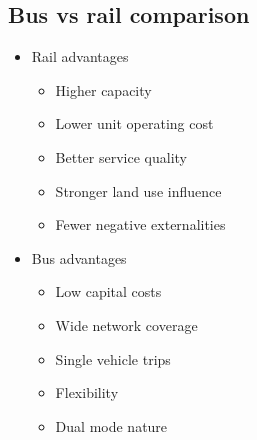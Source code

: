 \documentclass[11pt]{article}
\begin{document}
\subsection{Bus vs rail comparison}
\label{sec:orgf80c828}
\begin{itemize}
\item Rail advantages
\begin{itemize}
\item Higher capacity
\item Lower unit operating cost
\item Better service quality
\item Stronger land use influence
\item Fewer negative externalities
\end{itemize}
\item Bus advantages
\begin{itemize}
\item Low capital costs
\item Wide network coverage
\item Single vehicle trips
\item Flexibility
\item Dual mode nature
\end{itemize}
\end{itemize}
\end{document}
